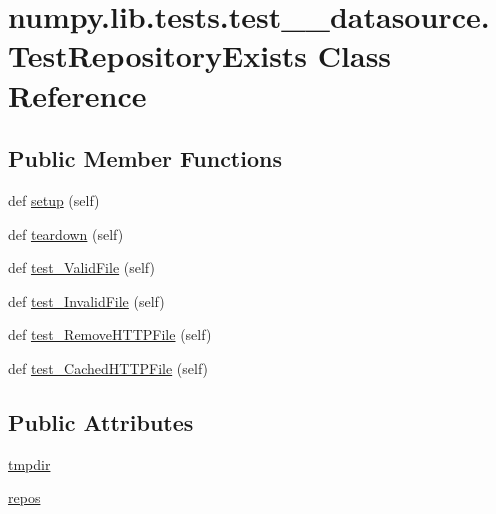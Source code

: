 \hypertarget{classnumpy_1_1lib_1_1tests_1_1test____datasource_1_1TestRepositoryExists}{}\section{numpy.\+lib.\+tests.\+test\+\_\+\+\_\+datasource.\+Test\+Repository\+Exists Class Reference}
\label{classnumpy_1_1lib_1_1tests_1_1test____datasource_1_1TestRepositoryExists}
\subsection*{Public Member Functions}
\begin{DoxyCompactItemize}
\item 
def \hyperlink{classnumpy_1_1lib_1_1tests_1_1test____datasource_1_1TestRepositoryExists_af8af5061c7170f596361560a961be5db}{setup} (self)
\item 
def \hyperlink{classnumpy_1_1lib_1_1tests_1_1test____datasource_1_1TestRepositoryExists_a40e858783f947ff5958d914d7fe98e6d}{teardown} (self)
\item 
def \hyperlink{classnumpy_1_1lib_1_1tests_1_1test____datasource_1_1TestRepositoryExists_a25d86747c80ecaf59c1d19447a3f0559}{test\+\_\+\+Valid\+File} (self)
\item 
def \hyperlink{classnumpy_1_1lib_1_1tests_1_1test____datasource_1_1TestRepositoryExists_abbb9f76f0b3d9657bebfdb2fe25b3454}{test\+\_\+\+Invalid\+File} (self)
\item 
def \hyperlink{classnumpy_1_1lib_1_1tests_1_1test____datasource_1_1TestRepositoryExists_aac52d04937e3beef436b45ebf6c6f712}{test\+\_\+\+Remove\+H\+T\+T\+P\+File} (self)
\item 
def \hyperlink{classnumpy_1_1lib_1_1tests_1_1test____datasource_1_1TestRepositoryExists_a64de57c5f5c7eba3f870624bc77ffb82}{test\+\_\+\+Cached\+H\+T\+T\+P\+File} (self)
\end{DoxyCompactItemize}
\subsection*{Public Attributes}
\begin{DoxyCompactItemize}
\item 
\hyperlink{classnumpy_1_1lib_1_1tests_1_1test____datasource_1_1TestRepositoryExists_a57361dc455b8598a88a112b7aec271e1}{tmpdir}
\item 
\hyperlink{classnumpy_1_1lib_1_1tests_1_1test____datasource_1_1TestRepositoryExists_a158288ce048ca16d51f06ed50868af34}{repos}
\end{DoxyCompactItemize}


